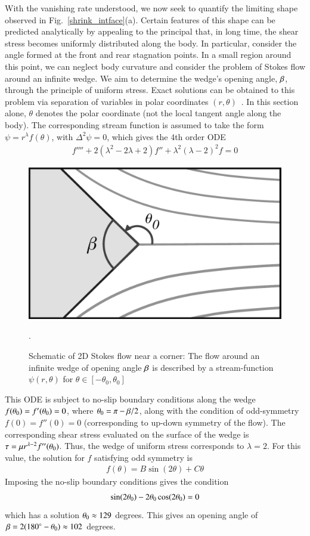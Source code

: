 \documentclass[preprint, 10pt]{elsarticle}
\begin{document}
With the vanishing rate understood, we now seek to quantify the limiting shape observed in Fig.~\ref{shrink_intface}(a). Certain features of this shape can be predicted analytically by appealing to the principal that, in long time, the shear stress becomes uniformly distributed along the body. In particular, consider the angle formed at the front and rear stagnation points. In a small region around this point, we can neglect body curvature and consider the problem of Stokes flow around an infinite wedge. We aim to determine the wedge's opening angle, $\beta$, through the principle of uniform stress. Exact solutions can be obtained to this problem via separation of variables in polar coordinates $(r, \theta)$~\cite{poz1997}. In this section alone, $\theta$ denotes the polar coordinate (not the local tangent angle along the body). The corresponding stream function is assumed to take the form $\psi = r^{\lambda}f(\theta)$, with $\Delta^2 \psi = 0$, which gives the 4th order ODE~\cite{poz1997}
\begin{align*}
  f'''' + 2(\lambda^2 - 2 \lambda + 2)f'' + \lambda^2(\lambda-2)^2 f = 0
\end{align*}

\begin{figure}%
\begin{center}
\includegraphics[width = 0.4 \textwidth]{./figs/corner.pdf}
\caption{Schematic of 2D Stokes flow near a corner: The flow around an infinite wedge of opening angle $\beta$ is described by a stream-function $\psi(r,\theta)$ for $\theta \in [-\theta_0, \theta_0]$}.
\label{corner}
\end{center}
\end{figure}
 
This ODE is subject to no-slip boundary conditions along the wedge $f(\theta_0) = f'(\theta_0) = 0$, where $\theta_0 = \pi - \beta/2$, along with the condition of odd-symmetry $f(0) = f''(0) = 0$ (corresponding to up-down symmetry of the flow).  The corresponding shear stress evaluated on the surface of the wedge is $\tau = \mu r^{\lambda-2} f''(\theta_0)$. Thus, the wedge of uniform stress corresponds to $\lambda = 2$. For this value, the solution for $f$ satisfying odd symmetry is
\begin{align*}
  f(\theta) = B \sin (2 \theta) + C \theta
\end{align*}
Imposing the no-slip boundary conditions gives the condition
\begin{align*}
  \sin(2 \theta_0) - 2 \theta_0 \cos(2 \theta_0) = 0
\end{align*}
which has a solution $\theta_0 \approx 129$ degrees. This gives an opening angle of $\beta = 2(180^{\circ} - \theta_0) \approx 102$ degrees. 
\end{document}

